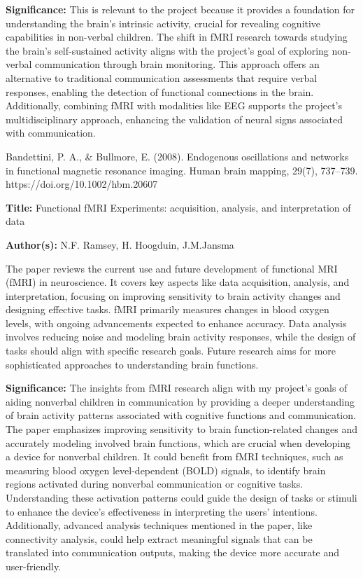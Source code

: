 \documentclass[12pt, research paper]{report}
\begin{document}
	\noindent \textbf{Significance:} This is relevant to the project because it provides a foundation for understanding the brain's intrinsic activity, crucial for revealing cognitive capabilities in non-verbal children. The shift in fMRI research towards studying the brain's self-sustained activity aligns with the project's goal of exploring non-verbal communication through brain monitoring. This approach offers an alternative to traditional communication assessments that require verbal responses, enabling the detection of functional connections in the brain. Additionally, combining fMRI with modalities like EEG supports the project's multidisciplinary approach, enhancing the validation of neural signs associated with communication. 
	\bigskip 
	
	\noindent Bandettini, P. A., \& Bullmore, E. (2008). Endogenous oscillations and networks in functional magnetic resonance imaging. Human brain mapping, 29(7), 737–739. https://doi.org/10.1002/hbm.20607
	\bigskip 
	\bigskip
	
	\noindent \textbf{Title:} Functional fMRI Experiments: acquisition, analysis, and interpretation of data
	
	\noindent \textbf{Author(s):} N.F. Ramsey, H. Hoogduin, J.M.Jansma
	\bigskip 
	
	The paper reviews the current use and future development of functional MRI (fMRI) in neuroscience. It covers key aspects like data acquisition, analysis, and interpretation, focusing on improving sensitivity to brain activity changes and designing effective tasks. fMRI primarily measures changes in blood oxygen levels, with ongoing advancements expected to enhance accuracy. Data analysis involves reducing noise and modeling brain activity responses, while the design of tasks should align with specific research goals. Future research aims for more sophisticated approaches to understanding brain functions.
	\bigskip
	
	\noindent \textbf{Significance:} The insights from fMRI research align with my project's goals of aiding nonverbal children in communication by providing a deeper understanding of brain activity patterns associated with cognitive functions and communication. The paper emphasizes improving sensitivity to brain function-related changes and accurately modeling involved brain functions, which are crucial when developing a device for nonverbal children.	It could benefit from fMRI techniques, such as measuring blood oxygen level-dependent (BOLD) signals, to identify brain regions activated during nonverbal communication or cognitive tasks. Understanding these activation patterns could guide the design of tasks or stimuli to enhance the device's effectiveness in interpreting the users' intentions. Additionally, advanced analysis techniques mentioned in the paper, like connectivity analysis, could help extract meaningful signals that can be translated into communication outputs, making the device more accurate and user-friendly.
	

	
	
	
	
\end{document}
